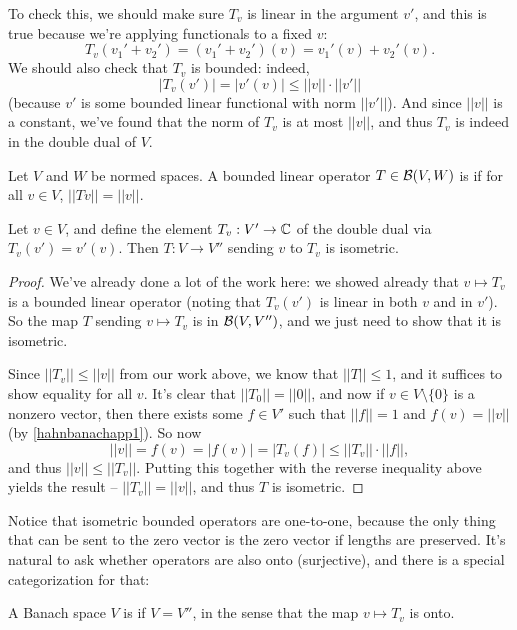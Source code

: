 To check this, we should make sure $T_v$ is linear in the argument $v'$, and this is true because we're applying functionals to a fixed $v$: 
\[
    T_{v}(v_1' + v_2') = (v_1' + v_2')(v) = v_1'(v) + v_2'(v).
\]
We should also check that $T_v$ is bounded: indeed, 
\[
    |T_v(v')| = |v'(v)| \le ||v|| \cdot ||v'||
\]
(because $v'$ is some bounded linear functional with norm $||v'||$). And since $||v||$ is a constant, we've found that the norm of $T_v$ is at most $||v||$, and thus $T_v$ is indeed in the double dual of $V$. 

\begin{definition}
Let $V$ and $W$ be normed spaces. A bounded linear operator $T \in \mathcal{B}(V, W)$ is  if for all $v \in V$, $||Tv|| = ||v||$.
\end{definition}

\begin{theorem}
Let $v \in V$, and define the element $T_v: V' \to \mathbb C$ of the double dual via $T_v(v') = v'(v)$. Then $T: V \to V''$ sending $v$ to $T_v$ is isometric.
\end{theorem}
\begin{proof}
We've already done a lot of the work here: we showed already that $v \mapsto T_v$ is a bounded linear operator (noting that $T_v(v')$ is linear in both $v$ and in $v'$). So the map $T$ sending $v \mapsto T_v$ is in $\mathcal{B}(V, V'')$, and we just need to show that it is isometric. 

Since $\boxed{||T_v|| \le ||v||}$ from our work above, we know that $||T|| \le 1$, and it suffices to show equality for all $v$. It's clear that $||T_0|| = ||0||$, and now if $v \in V \setminus \{0\}$ is a nonzero vector, then there exists some $f \in V'$ such that $||f|| = 1$ and $f(v) = ||v||$ (by \cref{hahnbanachapp1}). So now 
\[
    ||v|| = f(v) = |f(v)| = |T_v(f)| \le ||T_v|| \cdot ||f||,
\]
and thus $\boxed{||v|| \le ||T_v||}$. Putting this together with the reverse inequality above yields the result -- $||T_v|| = ||v||$, and thus $T$ is isometric.
\end{proof}

Notice that isometric bounded operators are one-to-one, because the only thing that can be sent to the zero vector is the zero vector if lengths are preserved. It's natural to ask whether operators are also onto (surjective), and there is a special categorization for that:

\begin{definition}
A Banach space $V$ is  if $V = V''$, in the sense that the map $v \mapsto T_v$ is onto.
\end{definition}

